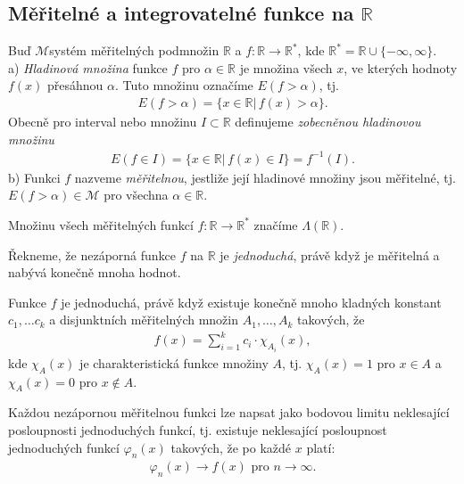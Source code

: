 \subsection{Měřitelné a integrovatelné funkce na $\mathbb{R}$}
\begin{definition}
Buď $\mathscr{M}$systém měřitelných podmnožin $\mathbb{R}$ a $f:\mathbb{R}\rightarrow \mathbb{R}^*$, kde $\mathbb{R}^*=\mathbb{R}\cup\{-\infty,\infty\}$.\\
a) \textit{Hladinová množina} funkce $f$ pro $\alpha\in \mathbb{R}$ je množina všech $x$, ve kterých hodnoty $f(x)$ přesáhnou $\alpha$. Tuto množinu označíme $E(f>\alpha)$, tj.
\begin{align*}
E(f>\alpha)=\{x\in \mathbb{R}|\,f(x)>\alpha\}.
\end{align*} 
Obecně pro interval nebo množinu $I\subset\mathbb{R}$ definujeme \textit{zobecněnou hladinovou množinu}
\begin{align*}
E(f\in I)=\{x\in \mathbb{R}|\,f(x)\in I\}=f^{-1}(I).
\end{align*}
b) Funkci $f$ nazveme \textit{měřitelnou}, jestliže její hladinové množiny jsou měřitelné, tj. $E(f>\alpha)\in \mathscr{M}$ pro všechna $\alpha\in \mathbb{R}$.
\end{definition}
Množinu všech měřitelných funkcí $f:\mathbb{R}\rightarrow\mathbb{R}^*$ značíme $\Lambda(\mathbb{R}).$
\begin{definition}
Řekneme, že nezáporná funkce $f$ na $\mathbb{R}$ je \textit{jednoduchá}, právě když je měřitelná a nabývá konečně mnoha hodnot. 
\end{definition}
Funkce $f$ je jednoduchá, právě když existuje konečně mnoho kladných konstant $c_1,\ldots c_k$ a disjunktních měřitelných množin $A_1,\ldots,A_k$ takových, že 
\begin{align*}
f(x)=\sum_{i=1}^k c_i\cdot \chi_{A_i}(x),
\end{align*}
kde $\chi_{A}(x)$ je charakteristická funkce množiny $A$, tj. $\chi_{A}(x)=1$ pro $x\in A$ a $\chi_{A}(x)=0$ pro $x\notin A$.
\begin{theorem}
Každou nezápornou měřitelnou funkci lze napsat jako bodovou limitu neklesající posloupnosti jednoduchých funkcí, tj. existuje neklesající posloupnost jednoduchých funkcí $\varphi_n(x)$ takových, že po každé $x$ platí:
\begin{align*}
\varphi_n(x)\rightarrow f(x) \text{ pro } n\rightarrow\infty.
\end{align*}
\end{theorem}
